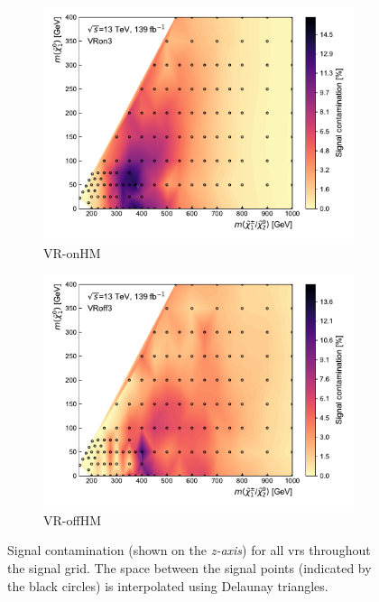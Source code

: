 \begin{figure}[H]
\begin{subfigure}[b]{0.5\linewidth}
		\centering\includegraphics[width=1.0\textwidth]{signal_contamination/plot_VRon3}
		\caption{VR-onHM\label{fig:signal_contaminations_VRon3}}
	\end{subfigure}\hfill
	\begin{subfigure}[b]{0.5\linewidth}
		\centering\includegraphics[width=1.0\textwidth]{signal_contamination/plot_VRoff3}
		\caption{VR-offHM\label{fig:signal_contaminations_VRoff3}}
	\end{subfigure}\hfill

	\caption{Signal contamination (shown on the \textit{z-axis}) for all \glspl{vr} throughout the signal grid. The space between the signal points (indicated by the black circles) is interpolated using Delaunay triangles.}
	\label{fig:signal_contaminations_VRs}
\end{figure}
